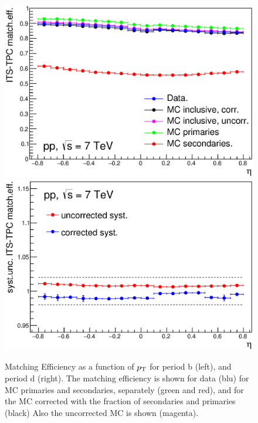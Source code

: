 \begin{figure}[!htb]
\begin{center}
\includegraphics[width=.49\textwidth]{FigCap4/ITSTPCmatchEff_10bpass4_vsEta.eps}
\includegraphics[width=.49\textwidth]{FigCap4/ITSTPCmatchEffSyst_10bpass4_vsEta.eps}
\caption{Matching Efficiency as a function of $p_{\rm T}$ for period b (left), and period d (right). The matching efficiency is shown for data (blu) for MC primaries and secondaries, separately (green and red), and for the MC corrected with the fraction of secondaries and primaries (black) Also the uncorrected MC is shown (magenta). }
\label{fig:CorrMatchEffVsEta}
\end{center}
\end{figure}

